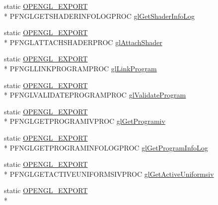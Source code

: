 \begin{DoxyCompactItemize}
\item 
static \hyperlink{_config_8h_a77401aa3bc0a379879047c1bd30f262e}{O\+P\+E\+N\+G\+L\+\_\+\+E\+X\+P\+O\+R\+T} \\*
P\+F\+N\+G\+L\+G\+E\+T\+S\+H\+A\+D\+E\+R\+I\+N\+F\+O\+L\+O\+G\+P\+R\+O\+C \hyperlink{class_agmd_1_1_g_l_driver_ab9b9dc2a7f705fec01cab6bf4f84c96d}{gl\+Get\+Shader\+Info\+Log}
\item 
static \hyperlink{_config_8h_a77401aa3bc0a379879047c1bd30f262e}{O\+P\+E\+N\+G\+L\+\_\+\+E\+X\+P\+O\+R\+T} \\*
P\+F\+N\+G\+L\+A\+T\+T\+A\+C\+H\+S\+H\+A\+D\+E\+R\+P\+R\+O\+C \hyperlink{class_agmd_1_1_g_l_driver_ac000032736207a64ef8da4cb758fa769}{gl\+Attach\+Shader}
\item 
static \hyperlink{_config_8h_a77401aa3bc0a379879047c1bd30f262e}{O\+P\+E\+N\+G\+L\+\_\+\+E\+X\+P\+O\+R\+T} \\*
P\+F\+N\+G\+L\+L\+I\+N\+K\+P\+R\+O\+G\+R\+A\+M\+P\+R\+O\+C \hyperlink{class_agmd_1_1_g_l_driver_a74bb96fef3d2405ab39ba42a64fec464}{gl\+Link\+Program}
\item 
static \hyperlink{_config_8h_a77401aa3bc0a379879047c1bd30f262e}{O\+P\+E\+N\+G\+L\+\_\+\+E\+X\+P\+O\+R\+T} \\*
P\+F\+N\+G\+L\+V\+A\+L\+I\+D\+A\+T\+E\+P\+R\+O\+G\+R\+A\+M\+P\+R\+O\+C \hyperlink{class_agmd_1_1_g_l_driver_a9effed72230c99f300e9977741781560}{gl\+Validate\+Program}
\item 
static \hyperlink{_config_8h_a77401aa3bc0a379879047c1bd30f262e}{O\+P\+E\+N\+G\+L\+\_\+\+E\+X\+P\+O\+R\+T} \\*
P\+F\+N\+G\+L\+G\+E\+T\+P\+R\+O\+G\+R\+A\+M\+I\+V\+P\+R\+O\+C \hyperlink{class_agmd_1_1_g_l_driver_ac3d35a41762c39c1dc5253a5d6d83b8a}{gl\+Get\+Programiv}
\item 
static \hyperlink{_config_8h_a77401aa3bc0a379879047c1bd30f262e}{O\+P\+E\+N\+G\+L\+\_\+\+E\+X\+P\+O\+R\+T} \\*
P\+F\+N\+G\+L\+G\+E\+T\+P\+R\+O\+G\+R\+A\+M\+I\+N\+F\+O\+L\+O\+G\+P\+R\+O\+C \hyperlink{class_agmd_1_1_g_l_driver_a2c68c1c02e5cfe4116be4fa73837b2f0}{gl\+Get\+Program\+Info\+Log}
\item 
static \hyperlink{_config_8h_a77401aa3bc0a379879047c1bd30f262e}{O\+P\+E\+N\+G\+L\+\_\+\+E\+X\+P\+O\+R\+T} \\*
P\+F\+N\+G\+L\+G\+E\+T\+A\+C\+T\+I\+V\+E\+U\+N\+I\+F\+O\+R\+M\+S\+I\+V\+P\+R\+O\+C \hyperlink{class_agmd_1_1_g_l_driver_afc12b8525341e9cd90eb9059c0f3b871}{gl\+Get\+Active\+Uniformsiv}
\item 
static \hyperlink{_config_8h_a77401aa3bc0a379879047c1bd30f262e}{O\+P\+E\+N\+G\+L\+\_\+\+E\+X\+P\+O\+R\+T} \\*

\end{DoxyCompactItemize}
